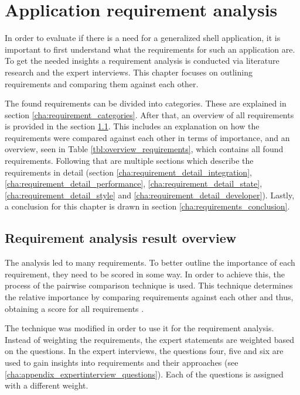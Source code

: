 
\chapter{Application requirement analysis}\label{cha:requirement}

In order to evaluate if there is a need for a generalized shell application, it is important to first understand what the requirements for such an application are.
To get the needed insights a requirement analysis is conducted via literature research and the expert interviews.
This chapter focuses on outlining requirements and comparing them against each other.

The found requirements can be divided into categories.
These are explained in section \ref{cha:requirement_categories}.
After that, an overview of all requirements is provided in the section \ref{cha:requirements_overview}.
This includes an explanation on how the requirements were compared against each other in terms of importance, and an overview, seen in Table \ref{tbl:overview_requirements}, which contains all found requirements.
Following that are multiple sections which describe the requirements in detail (section \ref{cha:requirement_detail_integration}, \ref{cha:requirement_detail_performance}, \ref{cha:requirement_detail_state}, \ref{cha:requirement_detail_style} and \ref{cha:requirement_detail_developer}).
Lastly, a conclusion for this chapter is drawn in section \ref{cha:requirements_conclusion}.





\section{Requirement analysis result overview}\label{cha:requirements_overview}

The analysis led to many requirements.
To better outline the importance of each requirement, they need to be scored in some way.
In order to achieve this, the process of the pairwise comparison technique is used.
This technique determines the relative importance by comparing requirements against each other and thus, obtaining a score for all requirements \cite[p.~573]{Achimugu.2014}.

The technique was modified in order to use it for the requirement analysis.
Instead of weighting the requirements, the expert statements are weighted based on the questions.
In the expert interviews, the questions four, five and six are used to gain insights into requirements and their approaches (see \ref{cha:appendix_expertinterview_questions}).
Each of the questions is assigned with a different weight.

